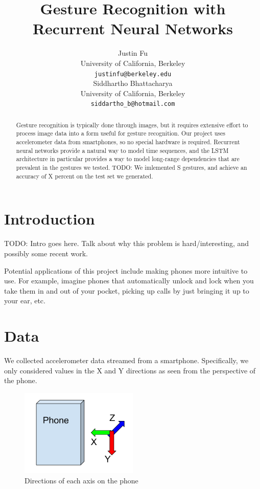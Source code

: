 \documentclass[11pt]{article}
\title{Gesture Recognition with Recurrent Neural Networks}
\author{Justin Fu \\
  University of California, Berkeley\\
  {\tt justinfu@berkeley.edu} \\\And
  Siddhartho Bhattacharya \\
  University of California, Berkeley\\
  {\tt siddartho\_b@hotmail.com} \\}
\date{}
\begin{document}
\maketitle 
\begin{abstract}
  Gesture recognition is typically done through images, but it requires
  extensive effort to process image data into a form useful for gesture
  recognition. Our project uses accelerometer data from smartphones,
  so no special hardware is required.
  Recurrent neural networks provide a natural way to model time
  sequences, and the LSTM architecture in particular provides a way
  to model long-range dependencies that are prevalent in
  the gestures we tested. TODO: We imlemented S gestures, and achieve an
  accuracy of X percent on the test set we generated.
\end{abstract}

\section{Introduction}

TODO: Intro goes here. Talk about why this problem is
hard/interesting, and possibly some recent work.

Potential applications of this project include making
phones more intuitive to use. For example, imagine 
phones that automatically unlock and lock when you take 
them in and out of your pocket, picking up calls by just
bringing it up to your ear, etc.

\section{Data}

We collected accelerometer data streamed from a smartphone.
Specifically, we only considered values in the X and Y directions
as seen from the perspective of the phone. 

\begin{figure}[ht]
\caption{Directions of each axis on the phone}
  \centering
    \includegraphics[width=0.5\textwidth]{phone_axis}
\end{figure}
\end{document}
